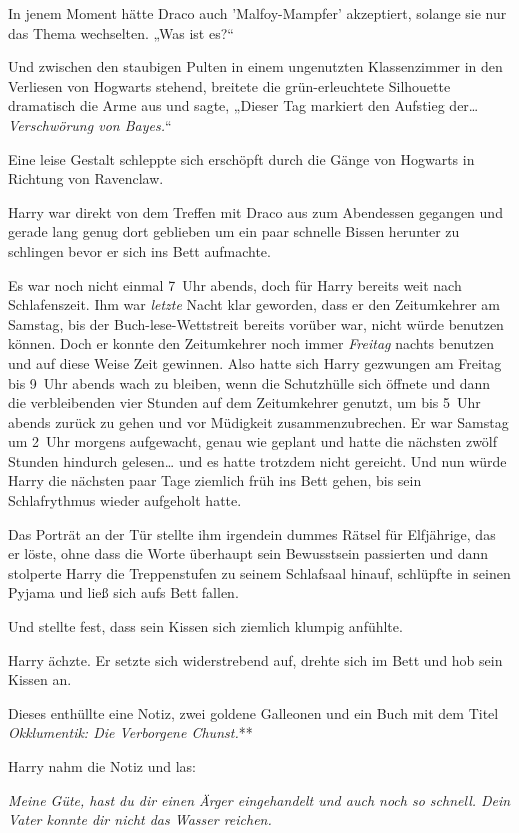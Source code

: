 {In jenem Moment hätte Draco auch 'Malfoy-Mampfer' akzeptiert, solange sie nur das Thema wechselten. „Was ist es?“

Und zwischen den staubigen Pulten in einem ungenutzten Klassenzimmer in den Verliesen von Hogwarts stehend, breitete die grün-erleuchtete Silhouette dramatisch die Arme aus und sagte, „Dieser Tag markiert den Aufstieg der… \emph{Verschwörung von Bayes.}“

\later

Eine leise Gestalt schleppte sich erschöpft durch die Gänge von Hogwarts in Richtung von Ravenclaw.

Harry war direkt von dem Treffen mit Draco aus zum Abendessen gegangen und gerade lang genug dort geblieben um ein paar schnelle Bissen herunter zu schlingen bevor er sich ins Bett aufmachte.

Es war noch nicht einmal 7~Uhr abends, doch für Harry bereits weit nach Schlafenszeit. Ihm war \emph{letzte} Nacht klar geworden, dass er den Zeitumkehrer am Samstag, bis der Buch-lese-Wettstreit bereits vorüber war, nicht würde benutzen können. Doch er konnte den Zeitumkehrer noch immer \emph{Freitag} nachts benutzen und auf diese Weise Zeit gewinnen. Also hatte sich Harry gezwungen am Freitag bis 9~Uhr abends wach zu bleiben, wenn die Schutzhülle sich öffnete und dann die verbleibenden vier Stunden auf dem Zeitumkehrer genutzt, um bis 5~Uhr abends zurück zu gehen und vor Müdigkeit zusammenzubrechen. Er war Samstag um 2~Uhr morgens aufgewacht, genau wie geplant und hatte die nächsten zwölf Stunden hindurch gelesen… und es hatte trotzdem nicht gereicht. Und nun würde Harry die nächsten paar Tage ziemlich früh ins Bett gehen, bis sein Schlafrythmus wieder aufgeholt hatte.

Das Porträt an der Tür stellte ihm irgendein dummes Rätsel für Elfjährige, das er löste, ohne dass die Worte überhaupt sein Bewusstsein passierten und dann stolperte Harry die Treppenstufen zu seinem Schlafsaal hinauf, schlüpfte in seinen Pyjama und ließ sich aufs Bett fallen.

Und stellte fest, dass sein Kissen sich ziemlich klumpig anfühlte.

Harry ächzte. Er setzte sich widerstrebend auf, drehte sich im Bett und hob sein Kissen an.

Dieses enthüllte eine Notiz, zwei goldene Galleonen und ein Buch mit dem Titel \emph{Okklumentik: Die Verborgene Chunst.}**

Harry nahm die Notiz und las:

\emph{Meine Güte, hast du dir einen Ärger eingehandelt und auch noch so schnell. Dein Vater konnte dir nicht das Wasser reichen.}

}
